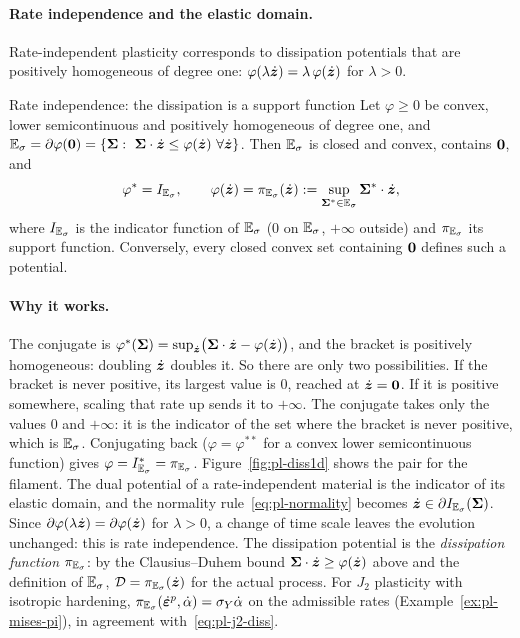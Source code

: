 \paragraph{Rate independence and the elastic domain.}
%
Rate-independent plasticity corresponds to dissipation potentials that are
positively homogeneous of degree one: $\varphi(\lambda\dot{\bm{z}})=\lambda\,\varphi(\dot{\bm{z}})$
for $\lambda>0$.
\begin{gbox}{Rate independence: the dissipation is a support function}\label{prop:pl-rateindep}
Let $\varphi\ge0$ be convex, lower semicontinuous and positively homogeneous of
degree one, and $\Esig=\partial\varphi(\vzero)=\{\vSig:\ \vSig\cdot\dot\vz\le\varphi(\dot\vz)\ \forall\dot\vz\}$.
Then $\mathbb{E}_{\sigma}$ is closed and convex, contains $\bm{0}$, and
\[
  \varphi^\ast=I_{\mathbb{E}_{\sigma}},\qquad
  \varphi(\dot{\bm{z}})=\pi_{\mathbb{E}_{\sigma}}(\dot{\bm{z}}):=\sup_{\bm{\Sigma}^\ast\in\mathbb{E}_{\sigma}}\bm{\Sigma}^\ast\cdot\dot{\bm{z}} ,
\]
where $I_{\mathbb{E}_{\sigma}}$ is the indicator function of $\mathbb{E}_{\sigma}$ ($0$ on $\mathbb{E}_{\sigma}$,
$+\infty$ outside) and $\pi_{\mathbb{E}_{\sigma}}$ its support function. Conversely,
every closed convex set containing $\bm{0}$ defines such a potential.
\end{gbox}
\paragraph{Why it works.} The conjugate is
$\varphi^\ast(\bm{\Sigma})=\sup_{\dot{\bm{z}}}\bigl(\bm{\Sigma}\cdot\dot{\bm{z}}-\varphi(\dot{\bm{z}})\bigr)$,
and the bracket is positively homogeneous: doubling $\dot{\bm{z}}$ doubles it. So
there are only two possibilities. If the bracket is never positive, its
largest value is $0$, reached at $\dot{\bm{z}}=\bm{0}$. If it is positive
somewhere, scaling that rate up sends it to $+\infty$. The conjugate takes
only the values $0$ and $+\infty$: it is the indicator of the set where the
bracket is never positive, which is $\mathbb{E}_{\sigma}$. Conjugating back
($\varphi=\varphi^{\ast\ast}$ for a convex lower semicontinuous function)
gives $\varphi=I_{\mathbb{E}_{\sigma}}^\ast=\pi_{\mathbb{E}_{\sigma}}$. Figure~\ref{fig:pl-diss1d} shows the
pair for the filament.
The dual potential of a rate-independent material is the indicator of its
elastic domain, and the normality rule~\eqref{eq:pl-normality} becomes
$\dot{\bm{z}}\in\partial I_{\mathbb{E}_{\sigma}}(\bm{\Sigma})$. Since $\partial\varphi(\lambda\dot{\bm{z}})=\partial\varphi(\dot{\bm{z}})$
for $\lambda>0$, a change of time scale leaves the evolution unchanged: this
is rate independence. The dissipation potential is the \emph{dissipation
function} $\pi_{\mathbb{E}_{\sigma}}$: by the Clausius--Duhem bound
$\bm{\Sigma}\cdot\dot{\bm{z}}\ge\varphi(\dot{\bm{z}})$ above and the definition of $\mathbb{E}_{\sigma}$, $\mathcal D=\pi_{\mathbb{E}_{\sigma}}(\dot{\bm{z}})$ for the actual
process. For $J_2$ plasticity with isotropic hardening,
$\pi_{\mathbb{E}_{\sigma}}(\dot{\bm{\varepsilon}}^p,\dot\alpha)=\sigma_{Y}\dot\alpha$ on the admissible rates
(Example~\ref{ex:pl-mises-pi}), in agreement
with~\eqref{eq:pl-j2-diss}.

